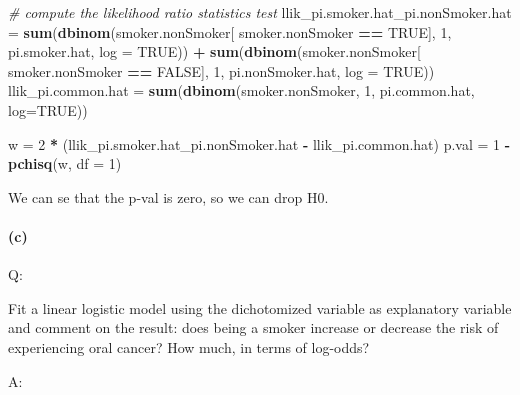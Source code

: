 \documentclass[
]{article}
\newenvironment{Shaded}{\begin{snugshade}}{\end{snugshade}}
\newcommand{\CommentTok}[1]{\textcolor[rgb]{0.56,0.35,0.01}{\textit{#1}}}
\newcommand{\DataTypeTok}[1]{\textcolor[rgb]{0.13,0.29,0.53}{#1}}
\newcommand{\DecValTok}[1]{\textcolor[rgb]{0.00,0.00,0.81}{#1}}
\newcommand{\KeywordTok}[1]{\textcolor[rgb]{0.13,0.29,0.53}{\textbf{#1}}}
\newcommand{\NormalTok}[1]{#1}
\newcommand{\OperatorTok}[1]{\textcolor[rgb]{0.81,0.36,0.00}{\textbf{#1}}}
\newcommand{\OtherTok}[1]{\textcolor[rgb]{0.56,0.35,0.01}{#1}}
\newcommand{\StringTok}[1]{\textcolor[rgb]{0.31,0.60,0.02}{#1}}
\begin{document}
\begin{Shaded}
\begin{Highlighting}[]
\CommentTok{# compute the likelihood ratio statistics test}
\NormalTok{llik_pi.smoker.hat_pi.nonSmoker.hat =}\StringTok{ }\KeywordTok{sum}\NormalTok{(}\KeywordTok{dbinom}\NormalTok{(smoker.nonSmoker[ smoker.nonSmoker }\OperatorTok{==}\StringTok{ }\OtherTok{TRUE}\NormalTok{], }\DecValTok{1}\NormalTok{, pi.smoker.hat, }\DataTypeTok{log =} \OtherTok{TRUE}\NormalTok{)) }\OperatorTok{+}\StringTok{ }
\StringTok{                                      }\KeywordTok{sum}\NormalTok{(}\KeywordTok{dbinom}\NormalTok{(smoker.nonSmoker[ smoker.nonSmoker }\OperatorTok{==}\StringTok{ }\OtherTok{FALSE}\NormalTok{], }\DecValTok{1}\NormalTok{, pi.nonSmoker.hat, }\DataTypeTok{log =} \OtherTok{TRUE}\NormalTok{))}
\NormalTok{llik_pi.common.hat =}\StringTok{ }\KeywordTok{sum}\NormalTok{(}\KeywordTok{dbinom}\NormalTok{(smoker.nonSmoker, }\DecValTok{1}\NormalTok{, pi.common.hat, }\DataTypeTok{log=}\OtherTok{TRUE}\NormalTok{))}

\NormalTok{w =}\StringTok{ }\DecValTok{2} \OperatorTok{*}\StringTok{ }\NormalTok{(llik_pi.smoker.hat_pi.nonSmoker.hat }\OperatorTok{-}\StringTok{ }\NormalTok{llik_pi.common.hat)}
\NormalTok{p.val =}\StringTok{ }\DecValTok{1} \OperatorTok{-}\StringTok{ }\KeywordTok{pchisq}\NormalTok{(w, }\DataTypeTok{df =} \DecValTok{1}\NormalTok{)}
\end{Highlighting}
\end{Shaded}

We can se that the p-val is zero, so we can drop H0.

\hypertarget{c}{%
\paragraph{(c)}\label{c}}

Q:

Fit a linear logistic model using the dichotomized variable as
explanatory variable and comment on the result: does being a smoker
increase or decrease the risk of experiencing oral cancer? How much, in
terms of log-odds?

A:

\begin{Shaded}
\end{Shaded}
\end{document}

